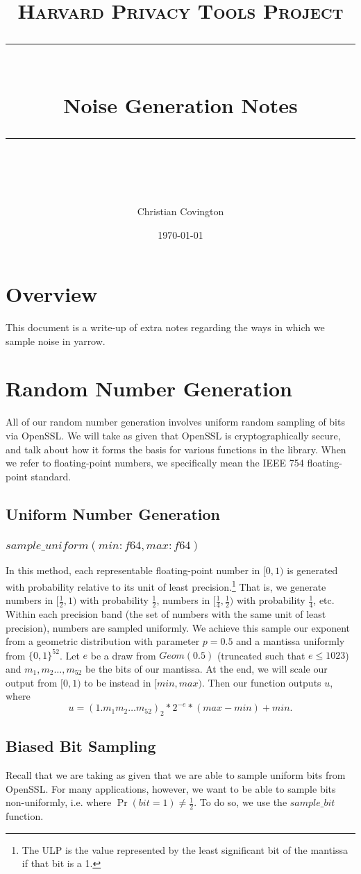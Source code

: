 \documentclass[11pt]{scrartcl} %
\title{
	\normalfont\normalsize
	\textsc{Harvard Privacy Tools Project}\\ %
	\vspace{25pt} %
	\rule{\linewidth}{0.5pt}\\ %
	\vspace{20pt} %
	{\huge Noise Generation Notes}\\ %
	\vspace{12pt} %
	\rule{\linewidth}{2pt}\\ %
	\vspace{12pt} %
}
\author{\LARGE Christian Covington} %
\date{\normalsize\today} %
\begin{document}
\maketitle

\section{Overview}
This document is a write-up of extra notes regarding the ways in which we sample noise in yarrow.

\section{Random Number Generation}
All of our random number generation involves uniform random sampling of bits via OpenSSL.
We will take as given that OpenSSL is cryptographically secure, and talk about how it
forms the basis for various functions in the library.
When we refer to floating-point numbers, we specifically mean the IEEE 754 floating-point standard.

\subsection{Uniform Number Generation}

\subsubsection{$sample\_uniform(min: f64, max: f64)$}
In this method, each representable floating-point number in $[0,1)$
is generated with probability relative to its unit of least precision.\footnote{The ULP is the value
represented by the least significant bit of the mantissa if that bit is a 1.}
That is, we generate numbers in $[\frac{1}{2},1)$ with probability $\frac{1}{2}$, numbers in $[\frac{1}{4}, \frac{1}{2})$
with probability $\frac{1}{4}$, etc. Within each precision band (the set of numbers with the same unit
of least precision), numbers are sampled uniformly.
We achieve this sample our exponent from a geometric distribution with parameter $p = 0.5$ and a mantissa uniformly from $\{0,1\}^{52}$.
Let $e$ be a draw from $Geom(0.5)$ (truncated such that $e \leq 1023$) and $m_1, m_2 \hdots, m_{52}$ be the bits of our mantissa.
At the end, we will scale our output from $[0,1)$ to be instead in $[min, max)$. Then our function outputs $u$, where
\[ u = (1.m_1m_2 \hdots m_{52})_2 * 2^{-e} * (max - min) + min. \]

\subsection{Biased Bit Sampling}
Recall that we are taking as given that we are able to sample uniform bits from OpenSSL.
For many applications, however, we want to be able to sample bits non-uniformly,
i.e. where $\Pr(bit = 1) \neq \frac{1}{2}$. To do so, we use the $sample\_bit$ function.
\end{document}
